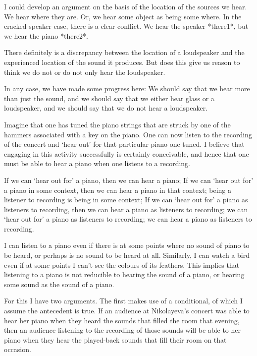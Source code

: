 \documentclass[sloppy, journal, git, bytitle, dodraft]{humapap}
\begin{document}
I could develop an argument on the basis of the location of the sources we hear. We hear where they are. Or, we hear some object as being some where. In the cracked speaker case, there is a clear conflict. We hear the speaker *there1*, but we hear the piano *there2*. 

There definitely is a discrepancy between the location of a loudspeaker and the experienced location of the sound it produces. But does this give us reason to think we do not or do not only hear the loudspeaker.
 

In any case, we have made some progress here: We should say that we hear more than just the sound, and we should say that we either hear glass or a loudspeaker, and we should say that we do not hear a loudspeaker. 


Imagine that one has tuned the piano strings that are struck by one of the hammers associated with a key on the piano. One can now listen to the recording of the concert and `hear out' for that particular piano one tuned. I believe that engaging in this activity successfully is certainly conceivable, and hence that one must be able to hear a piano when one listens to a recording. 
 
If we can `hear out for' a piano, then we can hear a piano; If we can `hear out for' a piano in some context, then we can hear a piano in that context; being a listener to recording is being in some context; If we can `hear out for' a piano as listeners to recording, then we can hear a piano as listeners to recording; we can `hear out for' a piano as listeners to recording; we can hear a piano as listeners to recording.

I can listen to a piano even if there is at some points where no sound of piano to be heard, or perhaps is no sound to be heard at all. Similarly, I can watch a bird even if at some points I can't see the colours of its feathers. This implies that listening to a piano is not reducible to hearing the sound of a piano, or hearing some sound as the sound of a piano. 



For this I have two arguments. The first makes use of a conditional, of which I assume the antecedent is true. If an audience at Nikolayeva's concert was able to hear her piano when they heard the sounds that filled the room that evening, then an audience listening to the recording of those sounds will be able to her piano when they hear the played-back sounds that fill their room on that occasion. %
\end{document}
